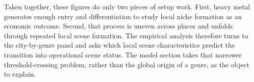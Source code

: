 Taken together, these figures do only two pieces of setup work. First, heavy metal generates enough
entry and differentiation to study local niche formation as an economic outcome. Second, that
process is uneven across places and unfolds through repeated local scene formation. The empirical
analysis therefore turns to the city-by-genre panel and asks which local scene characteristics
predict the transition into operational scene status. The model section takes that narrower
threshold-crossing problem, rather than the global origin of a genre, as the object to explain.
